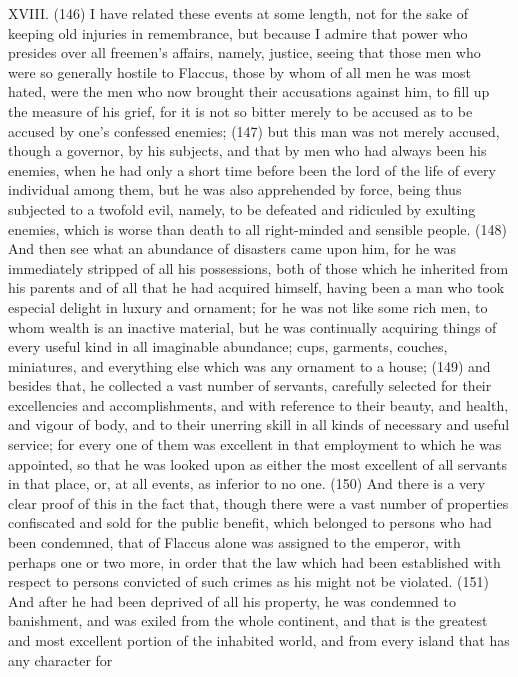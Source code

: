 XVIII. (146) I have related these events at some length, not for the sake of keeping old injuries in
remembrance, but because I admire that power who presides over all freemen's affairs, namely,
justice, seeing that those men who were so generally hostile to Flaccus, those by whom of all men
he was most hated, were the men who now brought their accusations against him, to fill up the
measure of his grief, for it is not so bitter merely to be accused as to be accused by one's
confessed enemies; (147) but this man was not merely accused, though a governor, by his
subjects, and that by men who had always been his enemies, when he had only a short time before
been the lord of the life of every individual among them, but he was also apprehended by force,
being thus subjected to a twofold evil, namely, to be defeated and ridiculed by exulting enemies,
which is worse than death to all right-minded and sensible people. (148) And then see what an
abundance of disasters came upon him, for he was immediately stripped of all his possessions,
both of those which he inherited from his parents and of all that he had acquired himself, having
been a man who took especial delight in luxury and ornament; for he was not like some rich men, to
whom wealth is an inactive material, but he was continually acquiring things of every useful kind in
all imaginable abundance; cups, garments, couches, miniatures, and everything else which was
any ornament to a house; (149) and besides that, he collected a vast number of servants, carefully
selected for their excellencies and accomplishments, and with reference to their beauty, and
health, and vigour of body, and to their unerring skill in all kinds of necessary and useful service;
for every one of them was excellent in that employment to which he was appointed, so that he was
looked upon as either the most excellent of all servants in that place, or, at all events, as inferior to
no one. (150) And there is a very clear proof of this in the fact that, though there were a vast
number of properties confiscated and sold for the public benefit, which belonged to persons who
had been condemned, that of Flaccus alone was assigned to the emperor, with perhaps one or two
more, in order that the law which had been established with respect to persons convicted of such
crimes as his might not be violated. (151) And after he had been deprived of all his property, he
was condemned to banishment, and was exiled from the whole continent, and that is the greatest
and most excellent portion of the inhabited world, and from every island that has any character for
